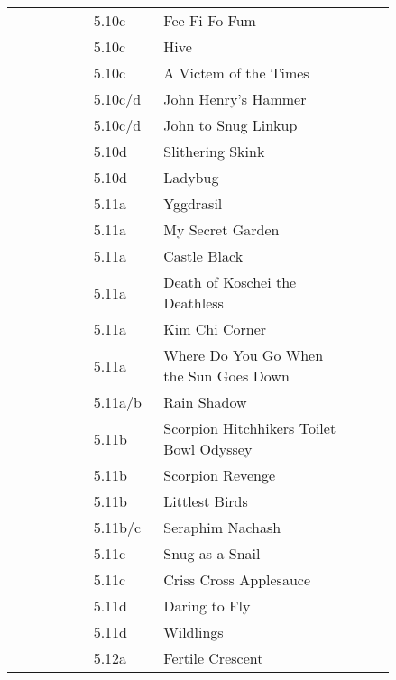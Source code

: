 \begin{flushleft}
\begin{center}
\begin{supertabular}{p{0.18\linewidth}p{0.13\linewidth}p{0.45\linewidth}p{0.08\linewidth}}
&5.10c&Fee-Fi-Fo-Fum & \pageref{rt:Fee-Fi-Fo-Fum} \\
&5.10c&Hive & \pageref{rt:Hive} \\
&5.10c&A Victem of the Times & \pageref{vr:A Victem of the Times} \\
&5.10c/d&John Henry's Hammer & \pageref{rt:John Henry's Hammer} \\
&5.10c/d&John to Snug Linkup & \pageref{vr:John to Snug Linkup} \\
&5.10d&Slithering Skink & \pageref{rt:Slithering Skink} \\
&5.10d&Ladybug & \pageref{rt:Ladybug} \\
&5.11a&Yggdrasil & \pageref{rt:Yggdrasil} \\
&5.11a&My Secret Garden & \pageref{rt:My Secret Garden} \\
&5.11a&Castle Black & \pageref{rt:Castle Black} \\
&5.11a&Death of Koschei the Deathless & \pageref{rt:Death of Koschei the Deathless} \\
&5.11a&Kim Chi Corner & \pageref{rt:Kim Chi Corner} \\
&5.11a&Where Do You Go When the Sun Goes Down & \pageref{rt:Where Do You Go When the Sun Goes Down} \\
&5.11a/b&Rain Shadow & \pageref{rt:Rain Shadow} \\
&5.11b&Scorpion Hitchhikers Toilet Bowl Odyssey & \pageref{rt:Scorpion Hitchhikers Toilet Bowl Odyssey} \\
&5.11b&Scorpion Revenge & \pageref{rt:Scorpion Revenge} \\
&5.11b&Littlest Birds & \pageref{rt:Littlest Birds} \\
&5.11b/c&Seraphim Nachash & \pageref{rt:Seraphim Nachash} \\
&5.11c&Snug as a Snail & \pageref{rt:Snug as a Snail} \\
&5.11c&Criss Cross Applesauce & \pageref{rt:Criss Cross Applesauce} \\
&5.11d&Daring to Fly & \pageref{rt:Daring to Fly} \\
&5.11d&Wildlings & \pageref{rt:Wildlings} \\
&5.12a&Fertile Crescent & \pageref{rt:Fertile Crescent} \\

\end{supertabular}
\end{center}
\end{flushleft}
